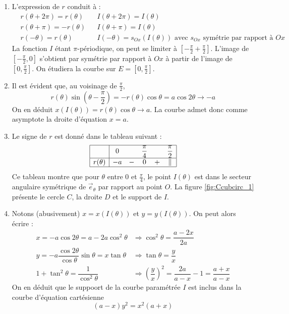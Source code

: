 \begin{enumerate}
\item L'expression de $r$ conduit à :
\begin{align*}
 &r(\theta+2\pi) = r(\theta) & &I(\theta +2\pi) = I(\theta)  \\
 &r(\theta+ \pi) = -r(\theta) & &I(\theta + \pi) = I(\theta)  \\
 &r(-\theta) = r(\theta) & &I(-\theta ) = s_{Ox}(I(\theta))  \text{ avec $s_{Ox}$ symétrie par rapport à $Ox$}
\end{align*}
La fonction $I$ étant $\pi$-périodique, on peut se limiter à $[-\frac{\pi}{2} +\frac{\pi}{2}]$. L'image de $[-\frac{\pi}{2},0]$ s'obtient par symétrie par rapport à $Ox$ à partir de l'image de $[0,\frac{\pi}{2}]$. On étudiera la courbe sur $E = [0,\frac{\pi}{2}]$.

\item Il est évident que, au voisinage de $\frac{\pi}{2}$, 
\begin{displaymath}
 r(\theta)\sin(\theta - \dfrac{\pi}{2}) = -r(\theta)\cos \theta = a\cos 2\theta 
\rightarrow -a
\end{displaymath}
On en déduit $x(I(\theta)) = r(\theta)\cos \theta \rightarrow a$. La courbe admet donc comme asymptote la droite d'équation $x=a$.
\item Le signe de $r$ est donné dans le tableau suivant :
\renewcommand{\arraystretch}{1.8}
\begin{displaymath}
 \begin{array}{|c|ccccc|} \hline
          & 0   &   & \dfrac{\pi}{4} &   & \dfrac{\pi}{2} \\ \hline
r(\theta) & -a  & - &       0        & + &  \Vert \\ \hline
\end{array}
\end{displaymath}
Ce tableau montre que pour $\theta$ entre $0$ et $\frac{\pi}{4}$, le point $I(\theta)$ est dans le secteur angulaire symétrique de $\overrightarrow{e}_\theta$ par rapport au point $O$. La figure \ref{fig:Ccubcirc_1} présente le cercle $C$, la droite $D$ et le support de $I$.
\item Notons (abusivement) $x=x(I(\theta))$ et $y=y(I(\theta))$. On peut alors écrire :
\begin{align*}
 x=-a\cos2\theta = a -2a\cos^2\theta 
&\Rightarrow  \cos^2 \theta = \dfrac{a-2x}{2a} \\
y=-a\dfrac{\cos 2\theta}{\cos \theta}\sin \theta =x\tan \theta 
&\Rightarrow \tan \theta =\dfrac{y}{x} \\
1+ \tan^2 \theta = \dfrac{1}{\cos^2 \theta}
&\Rightarrow \left( \dfrac{y}{x}\right)^2 = \dfrac{2a}{a-x}-1=\dfrac{a+x}{a-x} 
\end{align*}
On en déduit que le suppoort de la courbe paramétrée $I$ est inclus dans la courbe d'équation cartésienne
\begin{displaymath}
 (a-x)y^2 = x^2(a+x)
\end{displaymath}

\end{enumerate}

